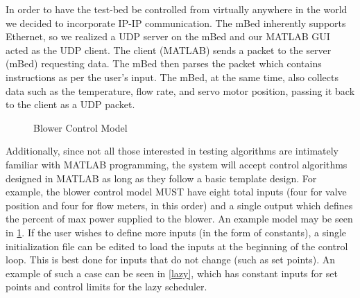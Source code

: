 \documentclass[a4paper,10pt,twocolumn]{article}
\begin{document}
In order to have the test-bed be controlled from virtually anywhere in the world we decided to incorporate IP-IP communication. The mBed inherently supports Ethernet, so we realized a UDP server on the mBed and our MATLAB GUI acted as the UDP client. The client (MATLAB) sends a packet to the server (mBed) requesting data. The mBed then parses the packet which contains instructions as per the user’s input. The mBed, at the same time, also collects data such as the temperature, flow rate, and servo motor position, passing it back to the client as a UDP packet.

\begin{figure}[t]
\centering
{}
\caption{Blower Control Model}
\label{blower_mdl}
\vspace{-5mm}
\end{figure}

Additionally, since not all those interested in testing algorithms are intimately familiar with MATLAB programming, the system will accept control algorithms designed in MATLAB as long as they follow a basic template design.  For example, the blower control model MUST have eight total inputs (four for valve position and four for flow meters, in this order) and a single output which defines the percent of max power supplied to the blower.  An example model may be seen in \ref{blower_mdl}.  If the user wishes to define more inputs (in the form of constants), a single initialization file can be edited to load the inputs at the beginning of the control loop.  This is best done for inputs that do not change (such as set points).  An example of such a case can be seen in \ref{lazy}, which has constant inputs for set points and control limits for the lazy scheduler.
\end{document}
